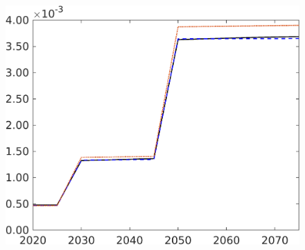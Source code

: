 \begin{figure}[h!!]
\begin{minipage}[]{0.32\textwidth}
\end{minipage}
	\begin{minipage}[]{0.32\textwidth}
		\includegraphics[width=1\textwidth]{../../codding_model/own_basedOnFried/optimalPol_elastS_DisuSci/figures/all_1705/Lg_CompEffOPT_T_NoTaus_spillover0_sep1_BN0_ineq0_red0_etaa0.79_lgd0.png}
	\end{minipage}
	\begin{minipage}[]{0.32\textwidth}

\end{minipage}
\end{figure}
